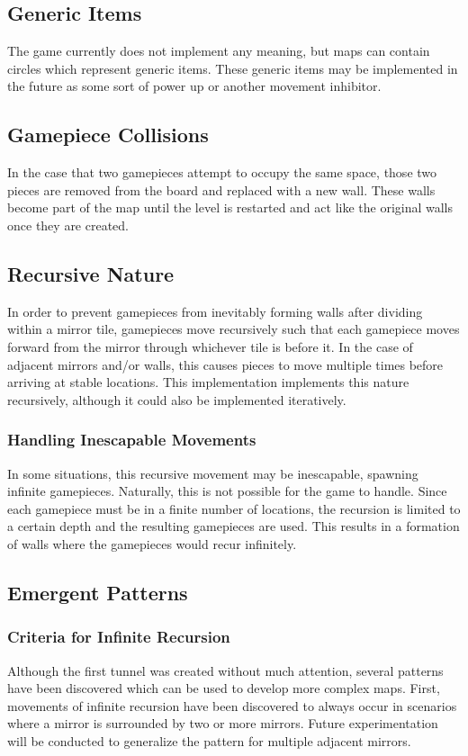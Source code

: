 \documentclass{scrreprt}
\begin{document}
			\subsection{Generic Items}
				The game currently does not implement any meaning, but maps can contain circles which represent generic items. These generic items may be implemented in the future as some sort of power up or another movement inhibitor. 
			
			\subsection{Gamepiece Collisions}
				In the case that two gamepieces attempt to occupy the same space, those two pieces are removed from the board and replaced with a new wall. These walls become part of the map until the level is restarted and act like the original walls once they are created. 
			
			\subsection{Recursive Nature}
				In order to prevent gamepieces from inevitably forming walls after dividing within a mirror tile, gamepieces move recursively such that each gamepiece moves forward from the mirror through whichever tile is before it. In the case of adjacent mirrors and/or walls, this causes pieces to move multiple times before arriving at stable locations. This implementation implements this nature recursively, although it could also be implemented iteratively. 

				\subsubsection{Handling Inescapable Movements}
					In some situations, this recursive movement may be inescapable, spawning infinite gamepieces. Naturally, this is not possible for the game to handle. Since each gamepiece must be in a finite number of locations, the recursion is limited to a certain depth and the resulting gamepieces are used. This results in a formation of walls where the gamepieces would recur infinitely. 
			
			\subsection{Emergent Patterns}
				
				\subsubsection{Criteria for Infinite Recursion}
					Although the first tunnel was created without much attention, several patterns have been discovered which can be used to develop more complex maps. First, movements of infinite recursion have been discovered to always occur in scenarios where a mirror is surrounded by two or more mirrors. Future experimentation will be conducted to generalize the pattern for multiple adjacent mirrors. 
				
\end{document}
